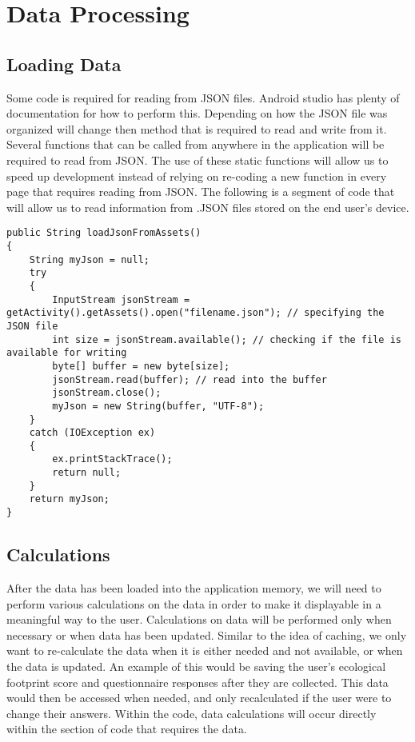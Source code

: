 \documentclass[onecolumn, draftclsnofoot,10pt, compsoc, tikz]{IEEEtran}
\begin{document}
\section{Data Processing}
\subsection{Loading Data}
Some code is required for reading from JSON files. Android studio has plenty of documentation for how to perform this. Depending on how the JSON file was organized will change then method that is required to read and write from it. Several functions that can be called from anywhere in the application will be required to read from JSON. The use of these static functions will allow us to speed up development instead of relying on re-coding a new function in every page that requires reading from JSON. The following is a segment of code that will allow us to read information from .JSON files stored on the end user's device.

\begin{lstlisting}
public String loadJsonFromAssets() 
{
    String myJson = null;
    try 
    {
        InputStream jsonStream = getActivity().getAssets().open("filename.json"); // specifying the JSON file
        int size = jsonStream.available(); // checking if the file is available for writing
        byte[] buffer = new byte[size];
        jsonStream.read(buffer); // read into the buffer
        jsonStream.close();
        myJson = new String(buffer, "UTF-8");
    } 
    catch (IOException ex) 
    {
        ex.printStackTrace();
        return null;
    }
    return myJson;
}
\end{lstlisting}

\subsection{Calculations}
After the data has been loaded into the application memory, we will need to perform various calculations on the data in order to make it displayable in a meaningful way to the user. Calculations on data will be performed only when necessary or when data has been updated. Similar to the idea of caching, we only want to re-calculate the data when it is either needed and not available, or when the data is updated. An example of this would be saving the user's ecological footprint score and questionnaire responses after they are collected. This data would then be accessed when needed, and only recalculated if the user were to change their answers. Within the code, data calculations will occur directly within the section of code that requires the data. 
\end{document}
